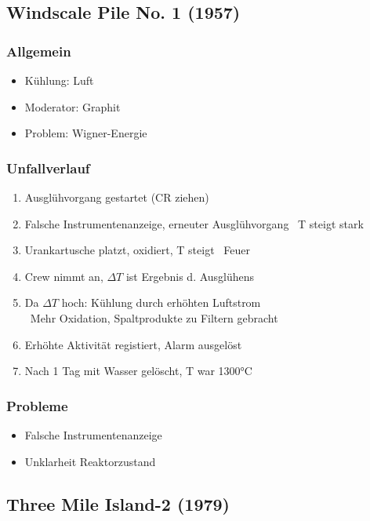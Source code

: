\documentclass[12pt]{article}
\begin{document}
\subsection{Windscale Pile No. 1 (1957)}

\subsubsection{Allgemein}
\begin{itemize}
	\item Kühlung: Luft
	\item Moderator: Graphit
	\item Problem: Wigner-Energie
\end{itemize}

\subsubsection{Unfallverlauf}
\begin{enumerate}
	\item Ausglühvorgang gestartet (CR ziehen)
	\item Falsche Instrumentenanzeige, erneuter Ausglühvorgang \textrightarrow\ T steigt stark
	\item Urankartusche platzt, oxidiert, T steigt \textrightarrow\ Feuer
	\item Crew nimmt an, \(\Delta T\) ist Ergebnis d. Ausglühens
	\item Da \(\Delta T\) hoch: Kühlung durch erhöhten Luftstrom\\
		\textrightarrow\ Mehr Oxidation, Spaltprodukte zu Filtern gebracht
	\item Erhöhte Aktivität registiert, Alarm ausgelöst
	\item Nach 1 Tag mit Wasser gelöscht, T war 1300°C
\end{enumerate}

\subsubsection{Probleme}
\begin{itemize}
	\item Falsche Instrumentenanzeige
	\item Unklarheit Reaktorzustand
\end{itemize}

\subsection{Three Mile Island-2 (1979)}
\end{document}
